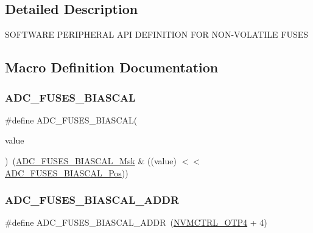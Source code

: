\subsection{Detailed Description}
S\+O\+F\+T\+W\+A\+RE P\+E\+R\+I\+P\+H\+E\+R\+AL A\+PI D\+E\+F\+I\+N\+I\+T\+I\+ON F\+OR N\+O\+N-\/\+V\+O\+L\+A\+T\+I\+LE F\+U\+S\+ES 

\subsection{Macro Definition Documentation}
\mbox{\label{group__fuses__api_ga378f726f6f4e5ef7b6d5b17e79792ad8}} 
\subsubsection{\texorpdfstring{ADC\_FUSES\_BIASCAL}{ADC\_FUSES\_BIASCAL}}
{\footnotesize\ttfamily \#define A\+D\+C\+\_\+\+F\+U\+S\+E\+S\+\_\+\+B\+I\+A\+S\+C\+AL(\begin{DoxyParamCaption}\item[{}]{value }\end{DoxyParamCaption})~(\mbox{\hyperlink{group__fuses__api_gaafc2b176601d6999e9cef3e9219b9738}{A\+D\+C\+\_\+\+F\+U\+S\+E\+S\+\_\+\+B\+I\+A\+S\+C\+A\+L\+\_\+\+Msk}} \& ((value) $<$$<$ \mbox{\hyperlink{group__fuses__api_ga27a6321a91ab931e0933dbcae98c350d}{A\+D\+C\+\_\+\+F\+U\+S\+E\+S\+\_\+\+B\+I\+A\+S\+C\+A\+L\+\_\+\+Pos}}))}

\mbox{\label{group__fuses__api_ga8972b5e1d68c668524cb8dc8e053dfa9}} 
\subsubsection{\texorpdfstring{ADC\_FUSES\_BIASCAL\_ADDR}{ADC\_FUSES\_BIASCAL\_ADDR}}
{\footnotesize\ttfamily \#define A\+D\+C\+\_\+\+F\+U\+S\+E\+S\+\_\+\+B\+I\+A\+S\+C\+A\+L\+\_\+\+A\+D\+DR~(\mbox{\hyperlink{group___s_a_m_d21_j18_a__base_ga138b4aca5a0446a745fe143c1dca8165}{N\+V\+M\+C\+T\+R\+L\+\_\+\+O\+T\+P4}} + 4)}

